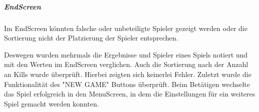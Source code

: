 \documentclass[a4paper]{scrreprt}
\begin{document}
\subparagraph{EndScreen}
Im EndScreen könnten falsche oder unbeteiligte Spieler gezeigt werden oder die Sortierung nicht der Platzierung der Spieler entsprechen. 

Deswegen wurden mehrmals die Ergebnisse und Spieler eines Spiels notiert und mit den Werten im EndScreen verglichen. Auch die Sortierung nach der Anzahl an Kills wurde überprüft. Hierbei zeigten sich keinerlei Fehler. Zuletzt wurde die Funktionalität des "NEW GAME" Buttons überprüft. Beim Betätigen wechselte das Spiel erfolgreich in den MenuScreen, in dem die Einstellungen für ein weiteres Spiel gemacht werden konnten.
\end{document}
